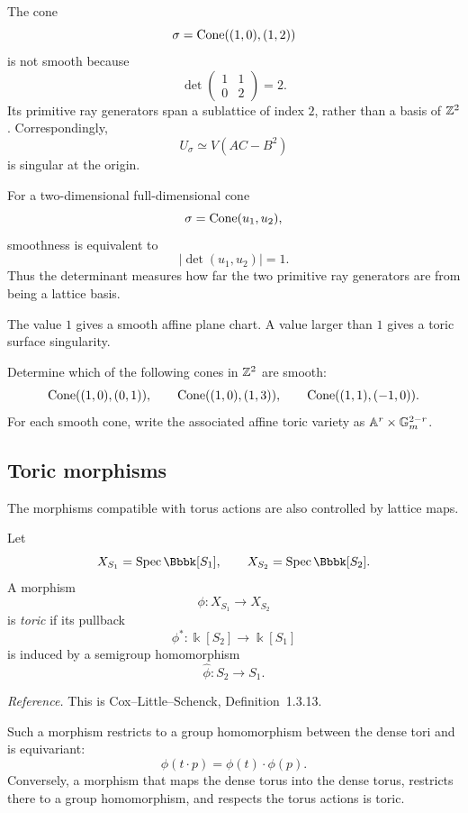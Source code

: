 \begin{example}
The cone
\[
\sigma=\operatorname{Cone}((1,0),(1,2))
\]
is not smooth because
\[
\det
\begin{pmatrix}
1&1\\
0&2
\end{pmatrix}
=2.
\]
Its primitive ray generators span a sublattice of index \(2\), rather
than a basis of \(\mathbb{Z}^2\). Correspondingly,
\[
U_\sigma\simeq V(AC-B^2)
\]
is singular at the origin.
\end{example}

\begin{surfacelaboratory}
For a two-dimensional full-dimensional cone
\[
\sigma=\operatorname{Cone}(u_1,u_2),
\]
smoothness is equivalent to
\[
|\det(u_1,u_2)|=1.
\]
Thus the determinant measures how far the two primitive ray
generators are from being a lattice basis.

The value \(1\) gives a smooth affine plane chart. A value larger than
\(1\) gives a toric surface singularity.
\end{surfacelaboratory}

\begin{pauseandthink}
Determine which of the following cones in \(\mathbb{Z}^2\) are smooth:
\[
\operatorname{Cone}((1,0),(0,1)),\qquad
\operatorname{Cone}((1,0),(1,3)),\qquad
\operatorname{Cone}((1,1),(-1,0)).
\]
For each smooth cone, write the associated affine toric variety as
\(\mathbb{A}^r\times\mathbb{G}_{m}^{2-r}\).
\end{pauseandthink}

\subsection{Toric morphisms}

The morphisms compatible with torus actions are also controlled by
lattice maps.

\begin{definition}
Let
\[
X_{S_1}=\Spec\Bbbk[S_1],
\qquad
X_{S_2}=\Spec\Bbbk[S_2].
\]
A morphism
\[
\phi:X_{S_1}\longrightarrow X_{S_2}
\]
is \emph{toric} if its pullback
\[
\phi^*:\Bbbk[S_2]\longrightarrow\Bbbk[S_1]
\]
is induced by a semigroup homomorphism
\[
\widehat\phi:S_2\longrightarrow S_1.
\]
\end{definition}

\noindent
\textit{Reference.}
This is Cox--Little--Schenck, Definition~1.3.13.

Such a morphism restricts to a group homomorphism between the dense
tori and is equivariant:
\[
\phi(t\cdot p)=\phi(t)\cdot\phi(p).
\]
Conversely, a morphism that maps the dense torus into the dense torus,
restricts there to a group homomorphism, and respects the torus
actions is toric.

